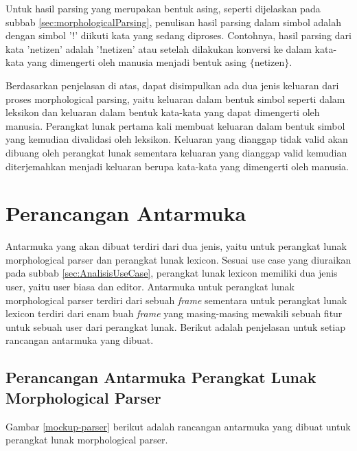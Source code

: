 Untuk hasil parsing yang merupakan bentuk asing, seperti dijelaskan pada subbab \ref{sec:morphologicalParsing}, penulisan hasil parsing dalam simbol adalah dengan simbol '!' diikuti kata yang sedang diproses. Contohnya, hasil parsing dari kata 'netizen' adalah '!netizen' atau setelah dilakukan konversi ke dalam kata-kata yang dimengerti oleh manusia menjadi bentuk asing $\lbrace$netizen$\rbrace$.

Berdasarkan penjelasan di atas, dapat disimpulkan ada dua jenis keluaran dari proses morphological parsing, yaitu keluaran dalam bentuk simbol seperti dalam leksikon dan keluaran dalam bentuk kata-kata yang dapat dimengerti oleh manusia. Perangkat lunak pertama kali membuat keluaran dalam bentuk simbol yang kemudian divalidasi oleh leksikon. Keluaran yang dianggap tidak valid akan dibuang oleh perangkat lunak sementara keluaran yang dianggap valid kemudian diterjemahkan menjadi keluaran berupa kata-kata yang dimengerti oleh manusia.

\section{Perancangan Antarmuka}
\label{sec:perancanganAntarmuka}

Antarmuka yang akan dibuat terdiri dari dua jenis, yaitu untuk perangkat lunak morphological parser dan perangkat lunak lexicon. Sesuai use case yang diuraikan pada subbab \ref{sec:AnalisisUseCase}, perangkat lunak lexicon memiliki dua jenis user, yaitu user biasa dan editor. Antarmuka untuk perangkat lunak morphological parser terdiri dari sebuah \textit{frame} sementara untuk perangkat lunak lexicon terdiri dari enam buah \textit{frame} yang masing-masing mewakili sebuah fitur untuk sebuah user dari perangkat lunak. Berikut adalah penjelasan untuk setiap rancangan antarmuka yang dibuat.

\subsection{Perancangan Antarmuka Perangkat Lunak Morphological Parser}
\label{sec:antarmukaParser}

Gambar \ref{mockup-parser} berikut adalah rancangan antarmuka yang dibuat untuk perangkat lunak morphological parser.

